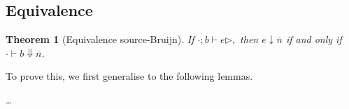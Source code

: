 \documentclass[12pt]{article}
\newcommand{\nil}{\cdot}
\newcommand{\h}[1]{\hat{#1}}
\newcommand{\n}[1]{\overline{#1}}
\newcommand{\tra}[4]{\ensuremath{#1; #2 \vdash #3 \rhd #4}}
\newcommand{\ev}[2]{\ensuremath{#1 \downarrow #2}}
\newcommand{\hev}[3]{\ensuremath{#1 \vdash #2 \Downarrow #3}}
\newcommand{\e}{e} %
\renewcommand{\c}{c} %
\renewcommand{\b}{b} %
\renewcommand{\h}{h}
\newcounter{statementcounter}
\newtheorem{lemma}[statementcounter]{Lemma}
\newtheorem{theorem}[statementcounter]{Theorem}
\begin{document}
\subsection*{Equivalence}

\begin{theorem} [Equivalence source-Bruijn]
\label{thm:equiv-hb} If \tra{\nil}{\b}{\e}, then \ev{\e}{\n{n}} if and only if \hev{\nil}{\b}{\n{n}}.
\end{theorem}

To prove this, we first generalise to the following lemmas.

\ldots

%
\end{document}
